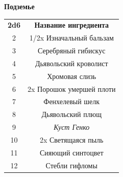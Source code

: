 \documentclass[a4paper, 9pt, twocolumn]{book}
\begin{document}
	\begin{table}[H]
		
		{\Large \textbf{Подземье}}
		
		\medspace 
		
		\centering 
		
		\begin{tabularx}{\linewidth}{c C}
			
			\textbf{2d6} & \textbf{Название ингредиента} \\
			
			2 & 1/2x Изначальный бальзам \\
			
			3 & Серебряный гибискус  \\
			
			4 & Дьявольский кроволист  \\
			
			5 & Хромовая слизь  \\
			
			6 & 2x Порошок умершей плоти \\
			
			7 & Фенхелевый шелк \\
			
			8 & Дьявольский плющ \\
			
			9 & \textit{Куст Генко} \\
			
			10 & 2x Светящаяся пыль \\
			
			11 & Сияющий синтоцвет \\
			
			12 & Стебли гифломы
		\end{tabularx}
	\end{table}
	
	
	
	
	
	
	
	
	
	
	
	
	
	
	
\end{document}
